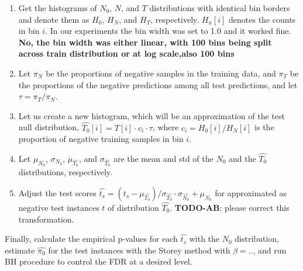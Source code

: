 \documentclass{article}
\newcommand{\todo}[2]{{\color{red} {\bf TODO-#1}: #2}}
\begin{document}
\begin{enumerate}%
	\itemsep-3pt  		
	\item Get the histograms of $N_0$, $N$, and $T$ distributions with identical bin borders and denote them as $H_0$, $H_N$, and $H_T$, respectively. $H_x[i]$ denotes the counts in bin $i$.  In our experiments the bin width was set to 1.0 and it worked fine. \textbf{No, the bin width was either linear, with 100 bins being split across train distribution or at log scale,also 100 bins}
	
	\item Let $\pi_N$ be the proportions of negative samples in the training data, and $\pi_T$ be the proportions of the negative predictions among all test predictions, and let $\tau=\pi_T/\pi_N$. 
	
	\item Let us create a new histogram, which will be an approximation of the test null distribution, $\hat{T_0}[i]=T[i]\cdot c_i\cdot \tau$, where $c_i=H_0[i]/H_N[i]$ is the proportion of negative training samples in bin $i$.
	
	\item Let $\mu_{N_0}$, $\sigma_{N_0}$, $\mu_{\hat{T_0}}$, and $\sigma_{\hat{T_0}}$ are the mean and std of the $N_0$ and the $\hat{T_0}$ distributions, respectively. 
	
	\item Adjust the test scores $\hat{t_s} = (t_s-\mu_{\hat{T_0}})/\sigma_{\hat{T_0}} \cdot \sigma_{\hat{N_0}} + \mu_{N_0}$ for approximated as negative test instances $t$ of distribution $\hat{T_0}$. \todo{AB}{please correct this transformation}.
\end{enumerate}


	Finally, calculate the empirical p-values for each $\hat{t_s}$ with the $N_0$ distribution, estimate  $\hat{\pi_0}$ for the test instances with the Storey method with $\beta= ..$, and run BH procedure to control the FDR at a desired level.
	
	
	
%	
%	
	
\end{document}
